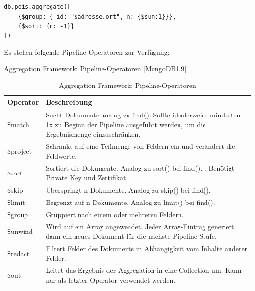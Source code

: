 \begin{lstlisting}[caption=MongoDB Aggregate, label=lst:MongoDBAggregate]
db.pois.aggregate([
    {$group: {_id: "$adresse.ort", n: {$sum:1}}},
    {$sort: {n: -1}}
])
\end{lstlisting}


Es stehen folgende Pipeline-Operatoren zur Verfügung:

 

\begin{table}[tbt]
\caption{Aggregation Framework: Pipeline-Operatoren [MongoDB1.9]}
\begin{center}
    \begin{tabular}{ l  p{12cm}}
    \toprule
    \textbf{Operator}  & \textbf{Beschreibung} \\
    \midrule
\rule{0pt}{17pt}
    \$match &Sucht Dokumente analog zu find(). Sollte idealerweise mindesten 1x zu Beginn der Pipeline ausgeführt werden, um die Ergebnismenge einzuschränken.\\
    
\rule{0pt}{17pt}
    \$project & Schränkt auf eine Teilmenge von Feldern ein und verändert die Feldwerte.  \\
    
\rule{0pt}{17pt}
	\$sort & Sortiert die Dokumente. Analog zu sort() bei find(). .\newline
	Benötigt Private Key und Zertifikat.  \\
	
\rule{0pt}{17pt}
    \$skip & Überspringt n Dokumente. Analog zu skip() bei find().  \\ 
    
\rule{0pt}{17pt}
    \$limit & Begrenzt auf n Dokumente. Analog zu limit() bei find().  \\

\rule{0pt}{17pt}
   \$group   &	Gruppiert nach einem oder mehreren Feldern. \\ 

\rule{0pt}{17pt}
	\$unwind  &	Wird auf ein Array angewendet. Jeder Array-Eintrag generiert dann ein neues Dokument für die nächste Pipeline-Stufe.\\

\rule{0pt}{17pt}
	\$redact  &	Filtert Felder des Dokuments in Abhängigkeit vom Inhalte anderer Felder.\\

\rule{0pt}{17pt}
	\$out  &	Leitet das Ergebnis der Aggregation in eine Collection um. Kann nur als letzter Operator verwendet werden.  \\
    \bottomrule
    \end{tabular}
\end{center}
\caption{Aggregation Framework: Pipeline-Operatoren \protect \footnotemark}
\end{table}



